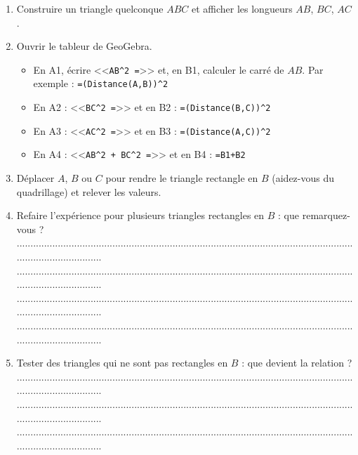 \begin{enumerate}
	\item Construire un triangle quelconque $ABC$ et afficher les longueurs $AB$, $BC$, $AC$.
	\item Ouvrir le tableur de GeoGebra.
	\begin{itemize}
		\item En A1, écrire <<\texttt{AB\string^2 =}>> et, en B1, calculer le carré de $AB$.
		Par exemple : \texttt{=(Distance(A,B))\string^2}
		\item En A2 : <<\texttt{BC\string^2 =}>> et en B2 : \texttt{=(Distance(B,C))\string^2}
		\item En A3 : <<\texttt{AC\string^2 =}>> et en B3 : \texttt{=(Distance(A,C))\string^2}
		\item En A4 : <<\texttt{AB\string^2 + BC\string^2 =}>> et en B4 : \texttt{=B1+B2}
	\end{itemize}
	\item Déplacer $A$, $B$ ou $C$ pour rendre le triangle rectangle en $B$ (aidez-vous du quadrillage) et relever les valeurs.
	\item Refaire l’expérience pour plusieurs triangles rectangles en $B$ : que remarquez-vous ?\\
	..........................................................................................................................................................\\
	..........................................................................................................................................................\\
	..........................................................................................................................................................\\
	..........................................................................................................................................................
	\item Tester des triangles qui ne sont pas rectangles en $B$ : que devient la relation ?\\
		..........................................................................................................................................................\\
	..........................................................................................................................................................\\
	..........................................................................................................................................................

\end{enumerate}
